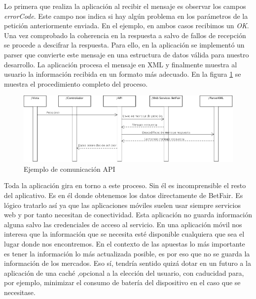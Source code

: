   Lo primera que realiza la aplicación al recibir el mensaje es observar los campos \emph{errorCode}. Este campo nos indica si hay algún problema en los parámetros de la petición anteriormente enviada. En el ejemplo, en ambos casos recibimos un \emph{OK}. Una vez comprobado la coherencia en la respuesta a salvo de fallos de recepción se procede a descifrar la respuesta. Para ello, en la aplicación se implementó un parser que convierte este mensaje en una estructura de datos válida para nuestro desarrollo.  La aplicación procesa el mensaje en XML y finalmente muestra al usuario la información recibida en un formato más adecuado. En la figura \ref{fig:proceso} se muestra el procedimiento completo del proceso.
       
 \begin{figure}[h!]
    \centering
       \includegraphics[width=0.95\linewidth]{./images/modelo_accion.png}
     \caption{Ejemplo de comunicación API }
   \label{fig:proceso}
\end{figure}
 
    
    Toda la aplicación gira en torno a este proceso. Sin él es incomprensible el resto del aplicativo. Es en él donde obtenemos los datos directamente de BetFair. Es lógico tratarlo así ya que las aplicaciones móviles suelen usar siempre servicios web y por tanto necesitan de conectividad. Esta aplicación no guarda información alguna salvo las credenciales de acceso al servicio. En una aplicación móvil nos interesa que la información que se necesita esté disponible cualquiera que sea el lugar donde nos encontremos. En el contexto de las apuestas lo más importante es tener la información lo más actualizada posible, es por eso que no se guarda la información de los mercados. Eso sí, tendría sentido quizá dotar en un futuro a la aplicación de una caché ,opcional a la elección del usuario, con caducidad para, por ejemplo, minimizar el consumo de batería del dispositivo en el caso que se necesitase.  
   

